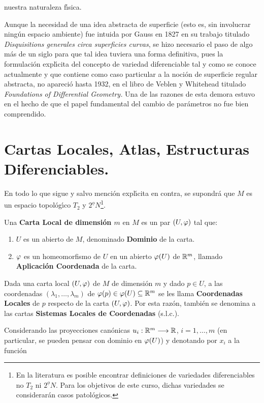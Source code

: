 \documentclass[cursovd_portada.tex]{subfiles}
\begin{document}
nuestra naturaleza f\'{\i}sica.
\par
Aunque la necesidad de una idea abstracta de superficie (esto es,
sin involucrar ning\'{u}n espacio ambiente) fue intuida por Gauss
en 1827 en su trabajo titulado \emph{Disquisitions generales
circa superficies curvas}, se hizo necesario el paso de algo
m\'{a}s de un siglo para que tal idea tuviera una forma
definitiva, pues la formulaci\'{o}n expl\'{\i}cita del concepto de
variedad diferenciable tal y como se conoce actualmente y que
contiene como caso particular a la noci\'{o}n de superficie
regular abstracta, no apareci\'{o} hasta 1932, en el libro de
Veblen y Whitehead titulado \emph{Foundations of Differential
Geometry.} Una de las razones de esta demora estuvo en el hecho
de que el papel fundamental del cambio de par\'{a}metros no fue
bien comprendido.
\section{Cartas Locales, Atlas, Estructuras Diferenciables.}
\hs En todo lo que sigue y salvo menci\'{o}n expl\'{\i}cita en
contra, se supondr\'{a} que $M$ es un espacio topol\'{o}g\'{\i}co
$T_2$ y $2^{\underline{o}}N$\footnote{En la literatura es posible
encontrar definiciones de variedades diferenciables no $T_2$ ni
$2^{\underline{o}}N$. Para los objetivos de este curso, dichas
variedades se considerar\'{a}n casos patol\'{o}gicos.}.
\begin{defi}
Una {\bf Carta Local de dimensi\'{o}n $m$} en $M$ es un par $(U,\varphi)$ tal que:
\begin{enumerate}
\item $U$ es un abierto de $M$, denominado {\bf Dominio} de la carta.
\item $\varphi$ es un homeomorfismo de $U$ en un abierto $\varphi(U)$ de $\mathbb{R}^m$, llamado {\bf Aplicaci\'{o}n Coordenada} de la
carta.
\end{enumerate}
\end{defi}
\begin{defi}
Dada una carta local $(U,\varphi)$ de $M$ de dimensi\'{o}n $m$ y dado $p\in U$, a las coordenadas $(\lambda_1,\dots
,\lambda_m)$ de $\varphi(p)\in\varphi(U)\subseteq\mathbb{R}^m$ se les llama {\bf Coordenadas Locales} de $p$ respecto de la carta
$(U,\varphi)$. Por esta raz\'{o}n, tambi\'{e}n se denomina a las cartas {\bf Sistemas Locales de Coordenadas} (s.l.c.).
\end{defi}
Considerando las proyecciones can\'{o}nicas $u_i:\mathbb{R}^m\longrightarrow\mathbb{R}$,
$i=1,\dots ,m$ (en particular, se pueden pensar con dominio en
$\varphi(U)$) y denotando por $x_i$ a la funci\'{o}n
\end{document}
